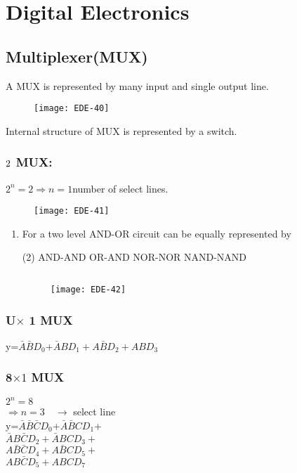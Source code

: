\chapter{Digital Electronics}
\section{Multiplexer(MUX)}
A MUX is represented by many input and single output line.
\begin{figure}[H]
	\centering
	\texttt{[image: EDE-40]}
\end{figure}
Internal structure of MUX is represented by a switch.
\subsection{{$2\time 1$ MUX:}}
$2^n=2\Rightarrow n=1$\quad number of select lines.
\begin{figure}[H]
	\centering
	\texttt{[image: EDE-41]}
\end{figure}
\begin{enumerate}
	\item For a two level AND-OR circuit can be equally represented by
	\begin{tasks}(2)
		\task[\textbf{a.}]AND-AND
		\task[\textbf{b.}]OR-AND
		\task[\textbf{c.}]NOR-NOR
		\task[\textbf{d.}] NAND-NAND
	\end{tasks}
	\begin{answer}$\left. \right. $\\
		\begin{figure}[H]
			\centering
			\texttt{[image: EDE-42]}
		\end{figure}
	\end{answer}
\end{enumerate}
\subsection{U$\times$ 1 MUX}
y=$\bar{A}\bar{B}D_0$+$\bar{A}BD_1+A\bar{B}D_2+ABD_3$
\subsection{8$\times 1$ MUX}
$	2^n=8$\\
$\Rightarrow n=3\quad\rightarrow$ select line\\
y=$\bar{A}\bar{B} \bar{C}D_0$+$\bar{A}\bar{B} CD_1$+\\
$\bar{A}B\bar{C}D_2+\bar{A}BCD_3+$\\
$A \bar{B}\bar{C}D_4+A\bar{B}CD_5+$\\
$AB\bar{C}D_5+ABCD_7$
